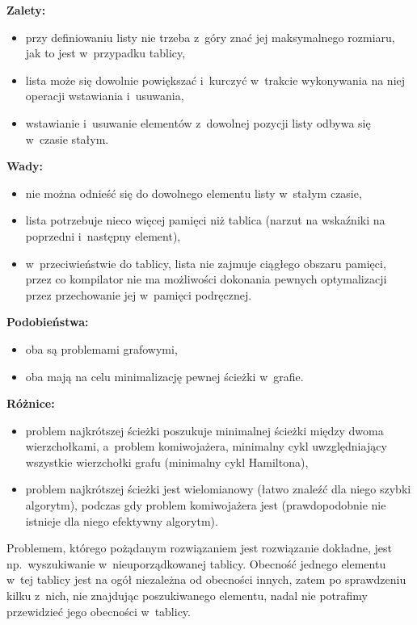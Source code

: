 \bigskip
\noindent\textbf{Zalety:}
\begin{itemize}
	\item przy definiowaniu listy nie trzeba z~góry znać jej maksymalnego rozmiaru, jak to jest w~przypadku tablicy,
	\item lista może się dowolnie powiększać i~kurczyć w~trakcie wykonywania na niej operacji wstawiania i~usuwania,
	\item wstawianie i~usuwanie elementów z~dowolnej pozycji listy odbywa się w~czasie stałym.
\end{itemize}
\textbf{Wady:}
\begin{itemize}
	\item nie można odnieść się do dowolnego elementu listy w~stałym czasie,
	\item lista potrzebuje nieco więcej pamięci niż tablica (narzut na wskaźniki na poprzedni i~następny element),
	\item w~przeciwieństwie do tablicy, lista nie zajmuje ciągłego obszaru pamięci, przez co kompilator nie ma możliwości dokonania pewnych optymalizacji przez przechowanie jej w~pamięci podręcznej.
\end{itemize}

\exercise %
\noindent\textbf{Podobieństwa:}
\begin{itemize}
	\item oba są problemami grafowymi,
	\item oba mają na celu minimalizację pewnej ścieżki w~grafie.
\end{itemize}
\textbf{Różnice:}
\begin{itemize}
	\item problem najkrótszej ścieżki poszukuje minimalnej ścieżki między dwoma wierzchołkami, a~problem komiwojażera, minimalny cykl uwzględniający wszystkie wierzchołki grafu (minimalny cykl Hamiltona),
	\item problem najkrótszej ścieżki jest wielomianowy (łatwo znaleźć dla niego szybki algorytm), podczas gdy problem komiwojażera jest  (prawdopodobnie nie istnieje dla niego efektywny algorytm).
\end{itemize}

\exercise %
Problemem, którego pożądanym rozwiązaniem jest rozwiązanie dokładne, jest np.\ wyszukiwanie w~nieuporządkowanej tablicy. Obecność jednego elementu w~tej tablicy jest na ogół niezależna od obecności innych, zatem po sprawdzeniu kilku z~nich, nie znajdując poszukiwanego elementu, nadal nie potrafimy przewidzieć jego obecności w~tablicy.

